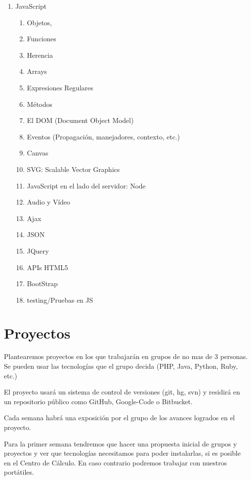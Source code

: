 \documentclass[11pt,a4paper]{article}
\begin{document}
\begin{enumerate}
\item JavaScript
  \begin{enumerate}
  \item Objetos, 
  \item Funciones 
  \item Herencia
  \item Arrays
  \item Expresiones Regulares
  \item Métodos
  \item El DOM (Document Object Model)
  \item Eventos (Propagación, manejadores, contexto, etc.)
  \item Canvas
  \item SVG: Scalable Vector Graphics
  \item JavaScript en el lado del servidor: Node
  \item Audio y Vídeo
  \item Ajax
  \item JSON
  \item JQuery
  \item APIs HTML5
  \item BootStrap
  \item testing/Pruebas en JS
  \end{enumerate}
\end{enumerate}

\section{Proyectos}
Plantearemos proyectos en los que trabajarán en grupos de no mas de 3 personas.
Se pueden usar las tecnologías que el grupo decida (PHP, Java, Python, Ruby, etc.)

El proyecto usará un sistema de control de versiones (git, hg, svn) y 
residirá en un repositorio público como GitHub, Google-Code o Bitbucket.

Cada semana habrá una exposición por el grupo de los avances logrados en el proyecto.

Para la primer semana tendremos que hacer una propuesta inicial de grupos y proyectos y ver que tecnologías necesitamos para poder instalarlas,
si es posible en el Centro de Cálculo. En caso contrario podremos trabajar con nuestros portátiles.
\end{document}
